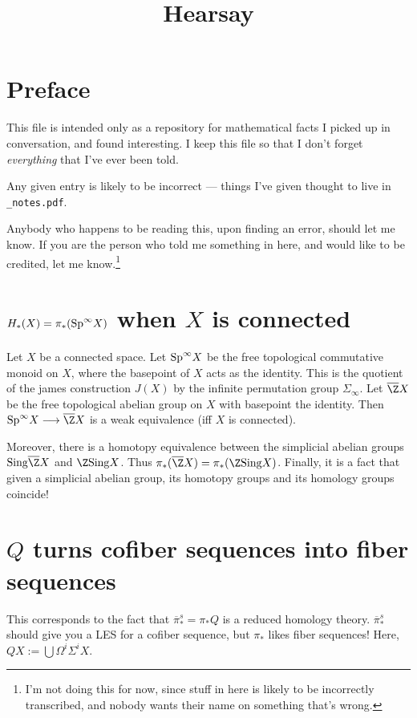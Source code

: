 \documentclass[11pt]{article}
\title{Hearsay}
\author{}
\date{}
\begin{document}
\tableofcontents
\newcommand{\HSsection}[2]{\section{#1 }}

\section*{Preface}
This file is intended only as a repository for mathematical facts I picked up in
conversation, and found interesting. I keep this file so that I don't forget
\emph{everything} that I've ever been told.

Any given entry is likely to be incorrect --- things I've given thought to live in \verb|_notes.pdf|.

Anybody who happens to be reading this, upon finding an
error, should let me know. If you are the person who told me something in here,
and would like to be credited, let me know.\footnote{I'm not doing this
for now, since stuff in here is likely to be incorrectly transcribed, and nobody
wants their name on something that's wrong.}

\pagebreak

\HSsection{\texorpdfstring{$H_*(X)=\pi_*(\textup{Sp}^\infty X)$ when $X$}
{HX=pi(SpX) when X} is connected}{29/6/11}
Let $X$ be a connected space. Let $\textup{Sp}^\infty X$ be the free topological
commutative monoid on $X$, where the basepoint of $X$ acts as the identity. This
is the quotient of the james construction $J(X)$ by the infinite permutation
group $\Sigma_\infty$. Let $\overline\Z X$ be the free topological abelian group
on $X$ with basepoint the identity. Then $\textup{Sp}^\infty X\to \overline\Z X$
is a weak equivalence (iff $X$ is connected).

Moreover, there is a homotopy equivalence between the simplicial abelian groups
$\textup{Sing}\overline\Z X$ and $\Z\textup{Sing}X$. Thus $\pi_*(\overline\Z
X)=\pi_*(\Z\textup{Sing}X)$. Finally, it is a fact that given a simplicial
abelian group, its homotopy groups and its homology groups coincide!


\HSsection{\texorpdfstring{$Q$}{Q} turns cofiber sequences into fiber sequences}
{29/6/11}
This corresponds to the fact that $\overline\pi_*^s=\pi_*Q$ is a reduced
homology theory. $\overline\pi_*^s$ should give you a LES for a cofiber
sequence, but $\pi_*$ likes fiber sequences! Here, $QX:=\bigcup\Omega^i\Sigma^i
X$.
\end{document}
